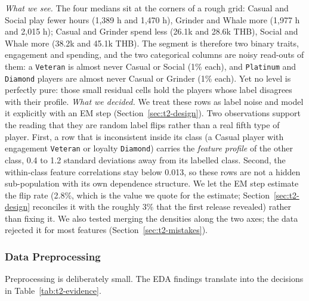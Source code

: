 \documentclass[../main.tex]{subfiles}
\begin{document}
\emph{What we see.} The four medians sit at the corners of a rough grid: Casual and Social play fewer hours (1{,}389 h and 1{,}470 h), Grinder and Whale more (1{,}977 h and 2{,}015 h); Casual and Grinder spend less (26.1k and 28.6k THB), Social and Whale more (38.2k and 45.1k THB). The segment is therefore two binary traits, engagement and spending, and the two categorical columns are noisy read-outs of them: a \texttt{Veteran} is almost never Casual or Social (1\% each), and \texttt{Platinum} and \texttt{Diamond} players are almost never Casual or Grinder (1\% each). Yet no level is perfectly pure: those small residual cells hold the players whose label disagrees with their profile. \emph{What we decided.} We treat these rows as label noise \citep{noisylabels} and model it explicitly with an EM step (Section~\ref{sec:t2-design}). Two observations support the reading that they are random label flips rather than a real fifth type of player. First, a row that is inconsistent inside its class (a Casual player with engagement \texttt{Veteran} or loyalty \texttt{Diamond}) carries the \emph{feature profile} of the other class, 0.4 to 1.2 standard deviations away from its labelled class. Second, the within-class feature correlations stay below 0.013, so these rows are not a hidden sub-population with its own dependence structure. We let the EM step estimate the flip rate (2.8\%, which is the value we quote for the estimate; Section~\ref{sec:t2-design} reconciles it with the roughly 3\% that the first release revealed) rather than fixing it. We also tested merging the densities along the two axes; the data rejected it for most features (Section~\ref{sec:t2-mistakes}).

\subsubsection{Data Preprocessing}

Preprocessing is deliberately small. The EDA findings translate into the decisions in Table~\ref{tab:t2-evidence}.
\end{document}
